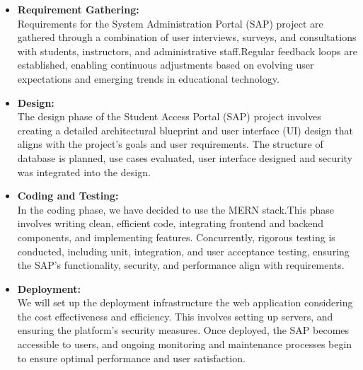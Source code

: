 \begin{itemize}
    \item \textbf{Requirement Gathering:}\\
    Requirements for the System Administration Portal (SAP) project are gathered through a combination of user interviews, surveys, and consultations with students, instructors, and administrative staff.Regular feedback loops are established, enabling continuous adjustments based on evolving user expectations and emerging trends in educational technology.
    \item \textbf{Design:}\\
    The design phase of the Student Access Portal (SAP) project involves creating a detailed architectural blueprint and user interface (UI) design that aligns with the project's goals and user requirements. The structure of database is planned, use cases evaluated, user interface designed and security was integrated into the design.
    \item \textbf{Coding and Testing:}\\
    In the coding phase, we have decided to use the MERN stack.This phase involves writing clean, efficient code, integrating frontend and backend components, and implementing features. Concurrently, rigorous testing is conducted, including unit, integration, and user acceptance testing, ensuring the SAP's functionality, security, and performance align with requirements.
    \item \textbf{Deployment:}\\
    We will set up the deployment infrastructure the web application considering the cost effectiveness and efficiency. This involves setting up servers, and ensuring the platform's security measures. Once deployed, the SAP becomes accessible to users, and ongoing monitoring and maintenance processes begin to ensure optimal performance and user satisfaction.
\end{itemize}
\newpage
